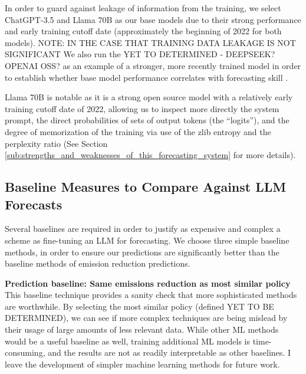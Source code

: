 \documentclass[12pt,a4paper]{article}
\begin{document}
In order to guard against leakage of information from the training, we select ChatGPT-3.5 and Llama 70B  as our base models due to their strong performance and early training cutoff date (approximately the beginning of 2022 for both models). NOTE: IN THE CASE THAT TRAINING DATA LEAKAGE IS NOT SIGNIFICANT We also run the YET TO DETERMINED - DEEPSEEK? OPENAI OSS? as an example of a stronger, more recently trained model in order to establish whether base model performance correlates with forecasting skill \ABSTRACT. 

Llama 70B is notable as it is a strong open source model with a relatively early training cutoff date of 2022, allowing us to inspect more directly the system prompt, the direct probabilities of sets of output tokens (the ``logits''), and the degree of memorization of the training via use of the zlib entropy and the perplexity ratio (See Section \ref{sub:strengths_and_weaknesses_of_this_forecasting_system} for more details).

\subsection{Baseline Measures to Compare Against LLM Forecasts}
Several baselines are required in order to justify as expensive and complex a scheme as fine-tuning an LLM for forecasting. We choose three simple baseline methods, in order to ensure our predictions are significantly better than the baseline methods of emission reduction predictions.

\textbf{Prediction baseline: Same emissions reduction as most similar policy}
This baseline technique provides a sanity check that more sophisticated methods are worthwhile. By selecting the most similar policy (defined YET TO BE DETERMINED), we can see if more complex techniques are being mislead by their usage of large amounts of less relevant data. While other ML methods would be a useful baseline as well, training additional ML models is time-consuming, and the results are not as readily interpretable as other baselines. I leave the development of simpler machine learning methods for future work.

\end{document}
